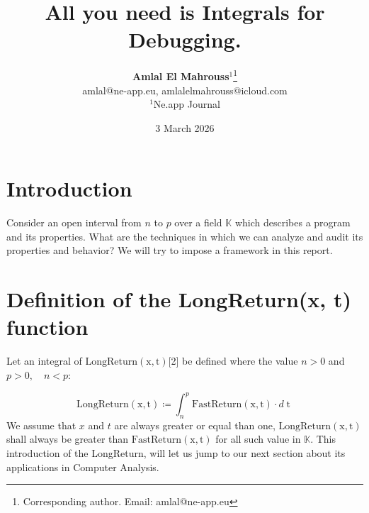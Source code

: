 \documentclass[10pt, twocolumn]{article}
\title{%
  \vspace{-1.5em}%
  \large\textbf{All you need is Integrals for Debugging.}%
}
\author{%
  \textbf{Amlal El Mahrouss}$^{1}$\thanks{Corresponding author. Email: amlal@ne-app.eu}
  \\amlal@ne-app.eu, amlalelmahrouss@icloud.com\\[0.4em]
  \small $^{1}$Ne.app Journal
}
\date{%
  \small 3 March 2026
}
\theoremstyle{plain}
\theoremstyle{definition}
\theoremstyle{remark}
\begin{document}

\section{Introduction}

Consider an open interval from $n$ to $p$ over a field $\mathbb{K}$ which describes a program and its properties. What are the techniques in which we can analyze and audit its properties and behavior? We will try to impose a framework in this report.

\section{Definition of the LongReturn(x, t) function}
\label{sec:cl-example-integrals}

Let an integral of $\operatorname{LongReturn(x, t)}$[2] be defined where the value $n > 0$ and $p > 0, \quad n < p$:

\begin{equation}
    \operatorname{LongReturn(x, t)} \coloneqq \int_{n}^{p} \operatorname{FastReturn(x, t)} \cdot d \operatorname{t}
\end{equation}
We assume that $x$ and $t$ are always greater or equal than one, $\operatorname{LongReturn(x, t)}$ shall always be greater than $\operatorname{FastReturn(x, t)}$ for all such value in $\mathbb{K}$.
This introduction of the LongReturn, will let us jump to our next section about its applications in Computer Analysis.
\end{document}

